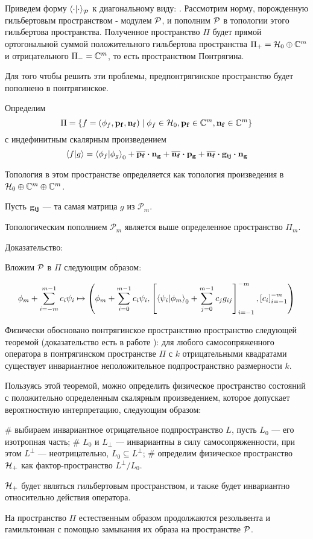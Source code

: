 Приведем форму $\ipcdot_\mcP$ к диагональному виду: . Рассмотрим норму, порожденную гильбертовым пространством - модулем $\mathcal{P}$, и пополним $\mathcal{P}$ в топологии этого гильбертова пространства. Полученное пространство $\Pi$ будет прямой ортогональной суммой положительного гильбертова пространства $\Pi_+ = \mathcal{H}_{0} \oplus \mathbb{C}^m$ и отрицательного $\Pi_- = \mathbb{C}^m$, то есть пространством Понтрягина.

Для того чтобы решить эти проблемы, предпонтрягинское пространство будет пополнено в понтрягинское.

Определим 
\[
\Pi = \{f = (\phi_f, \vb{p_f}, \vb{n_f}) \mid \phi_f \in \mathcal{H}_{0}, \vb{p_f} \in \mathbb{C}^m, \vb{n_f} \in \mathbb{C}^m \}
\]
с индефинитным скалярным произведением
\[
\ip{f}{g} =
\ip{\phi_f}{\phi_g}_0 +
\cconj{\vb{p_f}} \vdot \vb{n_g} +
\cconj{\vb{n_f}} \vdot \vb{p_g} + 
\cconj{\vb{n_f}} \vdot \vb{g_{ij}} \vdot \vb{n_g}
\]

Топология в этом пространстве определяется как топология произведения в $\mathcal{H}_{0} \oplus \mathbb{C}^m \oplus \mathbb{C}^m$.

Пусть $\vb{g_{ij}}$ — та самая матрица $g$ из $\mathcal{P}_m$. 

\begin{theorem}
Топологическим пополнием $\mathcal{P}_m$ является выше определенное пространство $\Pi_m$.
\end{theorem}

Доказательство: 

Вложим $\mathcal{P}$ в $\Pi$ следующим образом:

\[
\phi_m + \sum\limits_{i = -m}^{m - 1} c_i \psi_i \mapsto
\left(
\phi_m + \sum\limits_{i = 0}^{m - 1} c_i \psi_i,
\left[ \ip{\psi_i}{\phi_m}_0 + \sum\limits_{j = 0}^{m - 1} c_j g_{ij} \right]_{i = -1}^{-m},
\left[ c_i \right]_{i = -1}^{-m}
\right)
\]

Физически обосновано понтрягинское пространствно  пространство следующей теоремой (доказательство есть в работе \cite{pontryagin1944hermetian}): для любого самосопряженного оператора в понтрягинском пространстве $\Pi$ с $k$ отрицательными квадратами существует инвариантное неположительное подпространствно размерности $k$.

Пользуясь этой теоремой, можно определить физическое пространство состояний с положительно определенным скалярным произведением, которое допускает вероятностную интерпретацию, следующим образом:
\begin{elist}
# выбираем инвариантное отрицательное подпространство $L$, пусть $L_0$ — его изотропная часть;
# $L_0$ и $L_\perp$ — инвариантны в силу самосопряженности, при этом $L^\perp$ — неотрицательно, $L_0 \subseteq L^\perp$;
# определим физическое пространство $\mathcal{H}_{+}$ как фактор-пространство $L^\perp / L_0$.
\end{elist}
$\mathcal{H}_{+}$ будет являться гильбертовым пространством, и также будет инвариантно относительно действия оператора.

На пространство $\Pi$ естественным образом продолжаются резольвента и гамильтониан с помощью замыкания их образа на пространстве $\mathcal{P}$. 